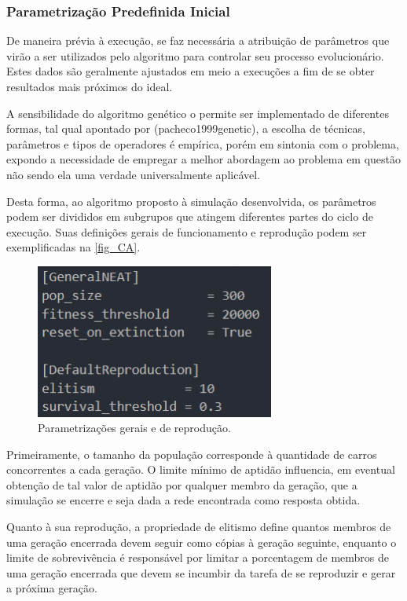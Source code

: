 \subsubsection{Parametrização Predefinida Inicial}
De maneira prévia à execução, se faz necessária a atribuição de parâmetros que virão a ser
utilizados pelo algoritmo para controlar seu processo evolucionário. Estes dados são geralmente
ajustados em meio a execuções a fim de se obter resultados mais próximos do ideal.

A sensibilidade do algoritmo genético o permite ser implementado de diferentes formas,
tal qual apontado por \citeonline(pacheco1999genetic), a escolha de técnicas, parâmetros e tipos de operadores
é empírica, porém em sintonia com o problema, expondo a necessidade de empregar a melhor abordagem
ao problema em questão não sendo ela uma verdade universalmente aplicável.

Desta forma, ao algoritmo proposto à simulação desenvolvida, os parâmetros podem ser divididos em
subgrupos que atingem diferentes partes do ciclo de execução. Suas definições gerais de funcionamento
e reprodução podem ser exemplificadas na \autoref{fig_CA}.

\begin{figure}[htb]
        \centering
        \caption{\label{fig_CA}Parametrizações gerais e de reprodução.}
        \includegraphics[width=0.7\textwidth]{images/CA.png}
\end{figure}

Primeiramente, o tamanho da população corresponde à quantidade de carros concorrentes a cada geração.
O limite mínimo de aptidão influencia, em eventual obtenção de tal valor de aptidão por qualquer membro da
geração, que a simulação se encerre e seja dada a rede encontrada como resposta obtida.

Quanto à sua reprodução, a propriedade de elitismo define quantos membros de uma geração encerrada devem
seguir como cópias à geração seguinte, enquanto o limite de sobrevivência é responsável por limitar a
porcentagem de membros de uma geração encerrada que devem se incumbir da tarefa de se reproduzir e gerar a próxima geração.

